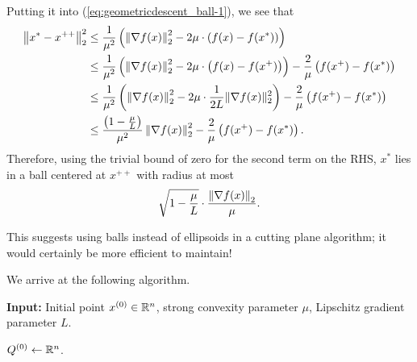 Putting it into (\ref{eq:geometricdescent_ball-1}), we see that
\begin{align}
\left\Vert x^{*}-x^{++}\right\Vert^{2}_{2} & \leq\frac{1}{\mu^{2}}\left(\left\Vert \nabla f(x)\right\Vert^{2}_{2}-2\mu\cdot\left(f(x)-f(x^{*})\right)\right)\nonumber \\
 & \leq\frac{1}{\mu^{2}}\left(\left\Vert \nabla f(x)\right\Vert^{2}_{2}-2\mu\cdot\left(f(x)-f(x^{+})\right)\right)-\frac{2}{\mu}\left(f(x^{+})-f(x^{*})\right)\nonumber \\
 & \leq\frac{1}{\mu^{2}}\left(\left\Vert \nabla f(x)\right\Vert^{2}_{2}-2\mu\cdot\frac{1}{2L}\|\nabla f(x)\|^{2}_{2}\right)-\frac{2}{\mu}\left(f(x^{+})-f(x^{*})\right)\nonumber \\
 & \leq\frac{\left(1-\frac{\mu}{L}\right)}{\mu^{2}}\left\Vert \nabla f(x)\right\Vert^{2}_{2}-\frac{2}{\mu}\left(f(x^{+})-f(x^{*})\right).\label{eq:radius-decrease}
\end{align}
Therefore, using the trivial bound of zero for the second term on
the RHS, $x^{*}$ lies in a ball centered at $x^{++}$ with radius
at most
\begin{equation}
\sqrt{1-\frac{\mu}{L}}\cdot\frac{\left\Vert \nabla f(x)\right\Vert_{2}}{\mu}.\label{eq:geometr_descent_simple-1}
\end{equation}

This suggests using balls instead of ellipsoids in a cutting plane
algorithm; it would certainly be more efficient to maintain!

We arrive at the following algorithm.

\begin{algorithm2e}[H]

\caption{$\mathtt{SphereMethod}$}

\SetAlgoLined

\textbf{Input:} Initial point $x^{(0)}\in\mathbb{R}^{n}$, strong convexity parameter
$\mu$, Lipschitz gradient parameter $L$.

$Q^{(0)}\leftarrow\mathbb{R}^{n}$.


\end{algorithm2e}

